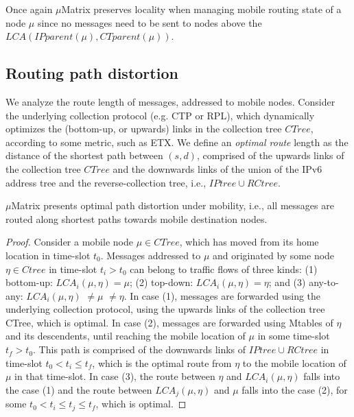 Once again $\mu$Matrix preserves locality when managing mobile routing state of a node $\mu$ since no messages need to be sent to nodes above the $LCA(IPparent(\mu),CTparent(\mu))$.

\subsection{Routing path distortion}
\label{subsec:path-distortion}

We analyze the route length of messages, addressed to mobile nodes. Consider the underlying collection protocol (e.g. CTP or RPL), which dynamically optimizes the (bottom-up, or upwards) links in the collection tree $CTree$, according to some metric, such as ETX. We define an \textit{optimal route} length as the distance of the shortest path between $(s,d)$, comprised of the upwards links of the collection tree $CTree$ and the downwards links of the union of the IPv6 address tree and the reverse-collection tree, i.e., $IPtree \cup RCtree$. 

\begin{theorem}
\label{theo:optimal-routing} $\mu$Matrix presents optimal path distortion under mobility, i.e., all messages are routed along shortest paths towards mobile destination nodes.
\end{theorem}

\begin{proof}
Consider a mobile node $\mu \in CTree$, which has moved from its home location in time-slot $t_0$. Messages addressed to $\mu$ and originated by some node $\eta \in Ctree$ in time-slot $t_i > t_0$ can belong to traffic flows of three kinds: (1) bottom-up: $LCA_i(\mu,\eta)=\mu$; (2) top-down: $LCA_i(\mu,\eta)=\eta$; and (3) any-to-any: $LCA_i(\mu,\eta)$ $\neq \mu $ $\neq \eta$. In case (1), messages are forwarded using the underlying collection protocol, using the upwards links of the collection tree CTree, which is optimal. In case (2), messages are forwarded using Mtables of $\eta$ and its descendents, until reaching the mobile location of $\mu$ in some time-slot $t_f>t_0$. This path is comprised of the downwards links of $IPtree \cup RCtree$ in time-slot $t_0 < t_i \leq t_f$, which is the optimal route from $\eta$ to the mobile location of $\mu$ in that time-slot. In case (3), the route between $\eta$ and $LCA_i(\mu,\eta)$ falls into the case (1) and the route between $LCA_j(\mu,\eta)$ and $\mu$ falls into the case (2), for some $t_0 < t_i \leq t_j \leq t_f$, which is optimal.
\end{proof}